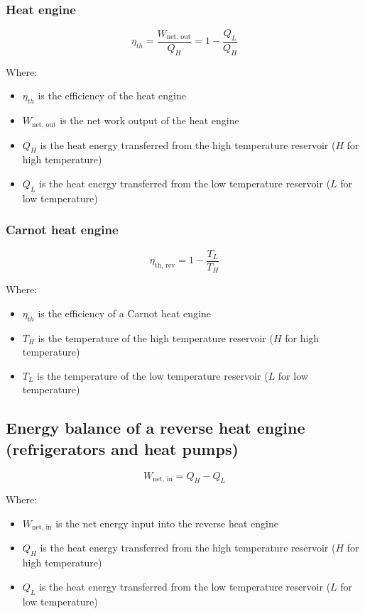 \documentclass[11pt]{article}
\begin{document}
\subsubsection{Heat engine}
\label{sec:org72994ab}
\[\eta_{th} = \frac{W_{\text{net, out}}}{Q_{H}} = 1 - \frac{Q_L}{Q_H}\]

Where:
\begin{itemize}
\item \(\eta_{th}\) is the efficiency of the heat engine
\item \(W_{\text{net, out}}\) is the net work output of the heat engine
\item \(Q_{H}\) is the heat energy transferred from the high temperature reservoir (\(H\) for high temperature)
\item \(Q_{L}\) is the heat energy transferred from the low temperature reservoir (\(L\) for low temperature)
\end{itemize}

\subsubsection{Carnot heat engine}
\label{sec:orga85be6d}
\[\eta_{\text{th, rev}} = 1 - \frac{T_L}{T_H}\]

Where:
\begin{itemize}
\item \(\eta_{th}\) is the efficiency of a Carnot heat engine
\item \(T_{H}\) is the temperature of the high temperature reservoir (\(H\) for high temperature)
\item \(T_{L}\) is the temperature of the low temperature reservoir (\(L\) for low temperature)
\end{itemize}

\subsection{Energy balance of a reverse heat engine (refrigerators and heat pumps)}
\label{sec:org8807ff6}
\[W_{\text{net, in}} = Q_{H} - Q_{L}\]

Where:
\begin{itemize}
\item \(W_{\text{net, in}}\) is the net energy input into the reverse heat engine
\item \(Q_{H}\) is the heat energy transferred from the high temperature reservoir (\(H\) for high temperature)
\item \(Q_{L}\) is the heat energy transferred from the low temperature reservoir (\(L\) for low temperature)
\end{itemize}
\end{document}

